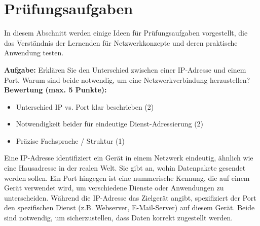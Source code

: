 \chapter{Prüfungsaufgaben}

In diesem Abschnitt werden einige Ideen für Prüfungsaufgaben vorgestellt, die das Verständnis der Lernenden für Netzwerkkonzepte und deren praktische Anwendung testen.

\begin{myexercise}

    \textbf{Aufgabe:} Erklären Sie den Unterschied zwischen einer IP-Adresse und einem Port. Warum sind beide notwendig, um eine Netzwerkverbindung herzustellen?
    \\[.5cm]
    \textbf{Bewertung (max. 5 Punkte):}
    \begin{itemize}
        \item Unterschied IP vs. Port klar beschrieben (2)
        \item Notwendigkeit beider für eindeutige Dienst-Adressierung (2)
        \item Präzise Fachsprache / Struktur (1)
    \end{itemize}
    \begin{myanswer}
        Eine IP-Adresse identifiziert ein Gerät in einem Netzwerk eindeutig, ähnlich wie eine Hausadresse in der realen Welt. Sie gibt an, wohin Datenpakete gesendet werden sollen. Ein Port hingegen ist eine nummerische Kennung, die auf einem Gerät verwendet wird, um verschiedene Dienste oder Anwendungen zu unterscheiden. Während die IP-Adresse das Zielgerät angibt, spezifiziert der Port den spezifischen Dienst (z.B. Webserver, E-Mail-Server) auf diesem Gerät. Beide sind notwendig, um sicherzustellen, dass Daten korrekt zugestellt werden.
    \end{myanswer}
\end{myexercise}

